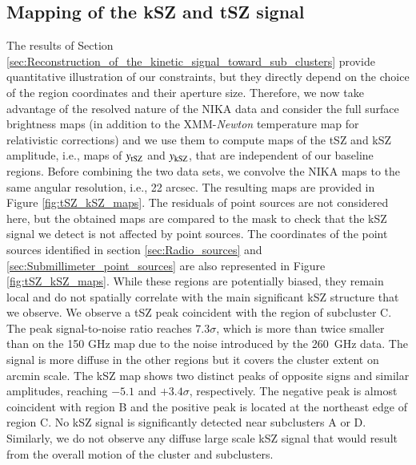 \documentclass[twocolumn,traditabstract]{aa}
\begin{document}
\subsection{Mapping of the kSZ and tSZ signal}
The results of Section \ref{sec:Reconstruction_of_the_kinetic_signal_toward_sub_clusters} provide quantitative illustration of our constraints, but they directly depend on the choice of the region coordinates and their aperture size. Therefore, we now take advantage of the resolved nature of the NIKA data and consider the full surface brightness maps (in addition to the XMM-\textit{Newton} temperature map for relativistic corrections) and we use them to compute maps of the tSZ and kSZ amplitude, i.e., maps of $y_{\rm tSZ}$ and $y_{\rm kSZ}$, that are independent of our baseline regions. Before combining the two data sets, we convolve the NIKA maps to the same angular resolution, i.e., 22 arcsec. The resulting maps are provided in Figure \ref{fig:tSZ_kSZ_maps}. The residuals of point sources are not considered here, but the obtained maps are compared to the mask to check that the kSZ signal we detect is not affected by point sources. The coordinates of the point sources identified in section \ref{sec:Radio_sources} and \ref{sec:Submillimeter_point_sources} are also represented in Figure \ref{fig:tSZ_kSZ_maps}. While these regions are potentially biased, they remain local and do not spatially correlate with the main significant kSZ structure that we observe. We observe a tSZ peak coincident with the region of subcluster C. The peak signal-to-noise ratio reaches $7.3 \sigma$, which is more than twice smaller than on the 150 GHz map due to the noise introduced by the 260~GHz data. The signal is more diffuse in the other regions but it covers the cluster extent on arcmin scale. The kSZ map shows two distinct peaks of opposite signs and similar amplitudes, reaching $-5.1$ and $+3.4 \sigma$, respectively. The negative peak is almost coincident with region B and the positive peak is located at the northeast edge of region C. No kSZ signal is significantly detected near subclusters A or D. Similarly, we do not observe any diffuse large scale kSZ signal that would result from the overall motion of the cluster and subclusters.
\end{document}
